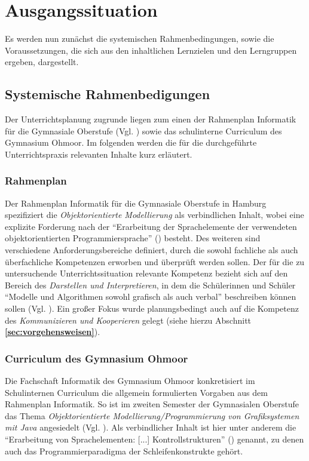 \documentclass[paper=a4, DIV=13, BCOR=12mm, twoside=on, onecolumn=on, open = any, titlepage =on, parskip =half-, headsepline = on, footsepline = on, chapterprefix = on, sectionprefix = on, appendixprefix = off, fontsize = 11pt, numbers = noenddot, abstract = off]{scrreprt}
\begin{document}
\chapter{Ausgangssituation}
Es werden nun zunächst die systemischen Rahmenbedingungen, sowie die Voraussetzungen, die sich aus den inhaltlichen Lernzielen und den Lerngruppen ergeben, dargestellt.
\par\singlespacing
\section{Systemische Rahmenbedigungen}
\onehalfspacing
Der Unterrichtsplanung zugrunde liegen zum einen der Rahmenplan Informatik für die Gymnasiale Oberstufe (Vgl. \cite{oberstufe:09}) sowie das schulinterne Curriculum des Gymnasium Ohmoor. Im folgenden werden die für die durchgeführte Unterrichtspraxis relevanten Inhalte kurz erläutert.
\subsection{Rahmenplan}
Der Rahmenplan Informatik für die Gymnasiale Oberstufe in Hamburg spezifiziert die \textit{Objektorientierte Modellierung} als verbindlichen Inhalt, wobei eine explizite Forderung nach der "`Erarbeitung der Sprachelemente der verwendeten objektorientierten Programmiersprache"' (\cite[S. 17]{oberstufe:09}) besteht. Des weiteren sind verschiedene Anforderungsbereiche definiert, durch die sowohl fachliche als auch überfachliche Kompetenzen erworben und überprüft werden sollen. Der für die zu untersuchende Unterrichtssituation relevante Kompetenz bezieht sich auf den Bereich des \textit{Darstellen und Interpretieren}, in dem die Schülerinnen und Schüler "`Modelle und Algorithmen sowohl grafisch als auch verbal"' beschreiben können sollen (Vgl. \cite[S.16]{oberstufe:09}). Ein großer Fokus wurde planungsbedingt auch auf die Kompetenz des \textit{Kommunizieren und Kooperieren} gelegt (siehe hierzu Abschnitt \textbf{\ref{sec:vorgehensweisen}}).

\par \singlespacing
\subsection{Curriculum des Gymnasium Ohmoor}
\onehalfspacing
Die Fachschaft Informatik des Gymnasium Ohmoor konkretisiert im Schulinternen Curriculum die allgemein formulierten Vorgaben aus dem Rahmenplan Informatik. So ist im zweiten Semester der Gymnasialen Oberstufe das Thema \textit{Objektorientierte Modellierung/Programmierung von Grafiksystemen mit Java} angesiedelt (Vgl. \cite[S.6f.]{ohmoor:16}). Als verbindlicher Inhalt ist hier unter anderem die "`Erarbeitung von Sprachelementen: [...] Kontrollstrukturen"' (\cite[S.7]{ohmoor:16}) genannt, zu denen auch das Programmierparadigma der Schleifenkonstrukte gehört.
\end{document}
